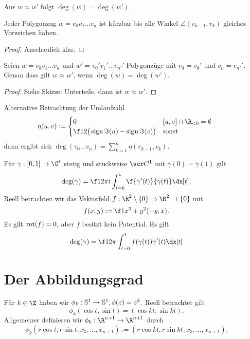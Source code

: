 \begin{lem}
	Aus $w \approx w'$ folgt $\deg(w) = \deg(w')$.
\end{lem}

\begin{lem}
	Jeder Polygonzug $w= v_0 v_1 \dotsc v_n$ ist kürzbar bis alle Winkel $\angle (v_{k-1}, v_k)$ gleiches Vorzeichen haben.
	\begin{proof}
		Anschaulich klar.
	\end{proof}
\end{lem}

\begin{st}
	Seien $w = v_0 v_1 \dotsc v_n$ und $w' = v_0' v_1' \dotsc v_{n'}'$ Polygonzüge mit $v_0 = v_0'$ und $v_n = v_{n'}'$.
	Genau dass gilt $w \approx w'$, wenn $\deg(w) = \deg(w')$.
	\begin{proof}
		Siehe Skizze: Unterteile, dann ist $w \approx w'$.
	\end{proof}
\end{st}


Alternative Betrachtung der Umlaufzahl
\[
	\eta(u, v) := \begin{cases}
		0 & [u,v] \cap \R_{<0} = \emptyset \\
		\f 12 \big( \sign \Im(u) - \sign \Im(v) \big) & \text{sonst}
	\end{cases}.
\]
dann ergibt sich $\deg(v_0 \dotsc v_n) = \sum_{k=1}^n \eta(v_{k-1}, v_k)$.

\begin{nt}
	Für $\gamma: [0,1] \to \C^*$ stetig und stückweise $\scr C^1$ mit $\gamma(0) = \gamma(1)$ gilt
	\[
		\deg(\gamma) = \f 1{2\pi i} \int_{t=0}^1 \f {\gamma'(t)}{\gamma(t)} \dx[t].
	\]
	Reell betrachten wir das Vektorfeld $f: \R^2 \setminus \{0\} \to \R^2 \to \{0\}$ mit
	\[
		f(x,y) := \f 1{x^2 + y^2} (-y, x).
	\]
	Es gilt $\rot(f) = 0$, aber $f$ besitzt kein Potential.
	Es gilt
	\[
		\deg(\gamma) = \f 1{2\pi} \int_{t=0}^1 f(\gamma(t)) \gamma'(t) \dx[t]
	\]
\end{nt}


\section{Der Abbildungsgrad}


Für $k \in \Z$ haben wir $\phi_k: \S^1 \to \S^1, \phi(z) = z^k$.
Reell betrachtet gilt
\[
	\phi_k(\cos t, \sin t) = (\cos kt, \sin kt).
\]
Allgemeiner definieren wir $\phi_k: \R^{n+1} \to \R^{n+1}$ durch
\[
	\phi_k(r \cos t, r \sin t, x_3, \dotsc, x_{n+1})
	:= (r\cos kt, r\sin kt, x_3, \dotsc, x_{n+1}).
\]

